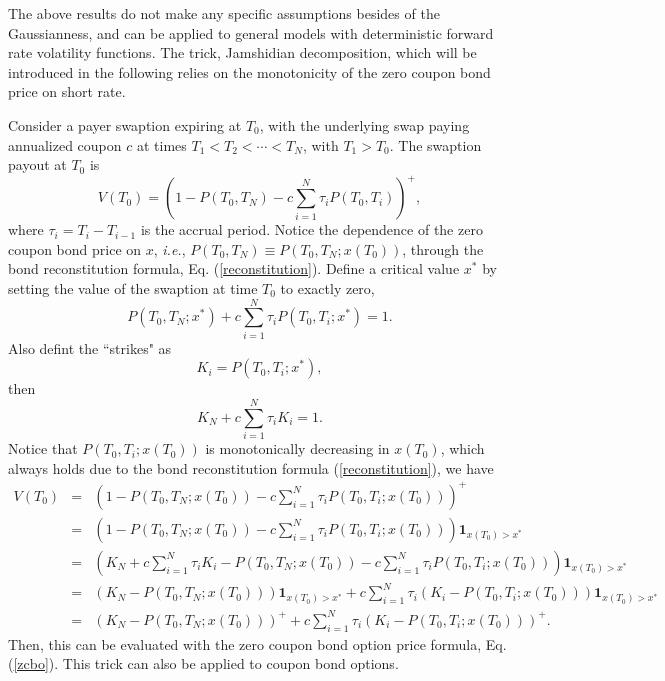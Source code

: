 \documentclass[12pt]{article}
\begin{document}
  The above results do not make any specific assumptions besides of the Gaussianness, and can be applied to general models with
  deterministic forward rate volatility functions. The trick, Jamshidian decomposition,
  which will be introduced in the following relies on the monotonicity of the zero coupon bond price on short rate.

  Consider a payer swaption expiring at $T_0$, with the underlying swap paying annualized coupon $c$ at times
  $T_1<T_2<\cdots<T_N$, with $T_1>T_0$. The swaption payout at $T_0$ is
  \begin{equation}
    V(T_0) = \left(1-P(T_0,T_N)-c\sum_{i=1}^N\tau_iP(T_0,T_i)\right)^+,
  \end{equation}
  where $\tau_i=T_i-T_{i-1}$ is the accrual period. Notice the dependence of the zero coupon bond price on $x$, {\it i.e.},
  $P(T_0,T_N)\equiv P(T_0,T_N;x(T_0))$, through the bond reconstitution formula, Eq. (\ref{reconstitution}). Define a
  critical value $x^*$ by setting the value of the swaption at time $T_0$ to exactly zero,
  \begin{equation}
    P(T_0,T_N;x^*)+c\sum_{i=1}^N\tau_iP(T_0,T_i;x^*)=1.
  \end{equation}
  Also defint the ``strikes" as
  \begin{equation}
    K_i=P(T_0,T_i;x^*),
  \end{equation}
  then
  \begin{equation}
    K_N+c\sum_{i=1}^N\tau_iK_i=1.
  \end{equation}
  Notice that $P(T_0,T_i;x(T_0))$ is monotonically decreasing in $x(T_0)$, which always holds due to the bond reconstitution
  formula (\ref{reconstitution}), we have
  \begin{eqnarray}
    V(T_0)&=&\left(1-P(T_0,T_N;x(T_0))-c\sum_{i=1}^N\tau_iP(T_0,T_i;x(T_0))\right)^+\nonumber\\
          &=&\left(1-P(T_0,T_N;x(T_0))-c\sum_{i=1}^N\tau_iP(T_0,T_i;x(T_0))\right)\textbf{1}_{x(T_0)>x^*}\nonumber\\
          &=&\left(K_N+c\sum_{i=1}^N\tau_iK_i-P(T_0,T_N;x(T_0))-c\sum_{i=1}^N\tau_iP(T_0,T_i;x(T_0))\right)\textbf{1}_{x(T_0)>x^*}\nonumber\\
          &=&\left(K_N-P(T_0,T_N;x(T_0))\right)\textbf{1}_{x(T_0)>x^*}
                    + c\sum_{i=1}^N\tau_i\left(K_i-P(T_0,T_i;x(T_0))\right)\textbf{1}_{x(T_0)>x^*}\nonumber\\
          &=&\left(K_N-P(T_0,T_N;x(T_0))\right)^+
       + c\sum_{i=1}^N\tau_i\left(K_i-P(T_0,T_i;x(T_0))\right)^+.
  \end{eqnarray}
  Then, this can be evaluated with the zero coupon bond option price formula, Eq. (\ref{zcbo}).
  This trick can also be applied to coupon bond options.
   
\end{document}
